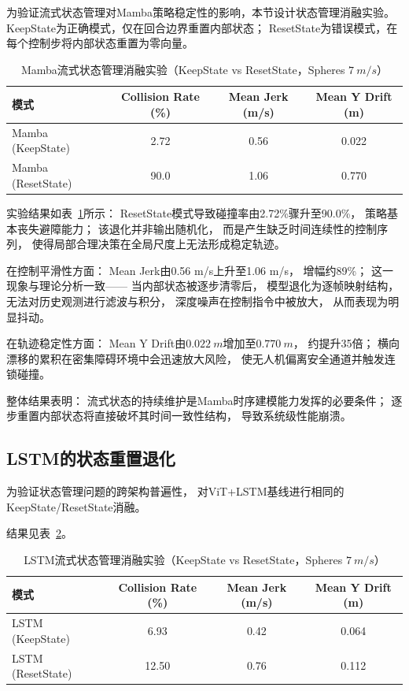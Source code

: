 为验证流式状态管理对Mamba策略稳定性的影响，本节设计状态管理消融实验。
KeepState为正确模式，仅在回合边界重置内部状态；
ResetState为错误模式，在每个控制步将内部状态重置为零向量。

\begin{table}[htbp]
\centering
\caption{Mamba流式状态管理消融实验（KeepState vs ResetState，Spheres $\SI{7}{m/s}$）}
\label{tab:state_ablation_ch4}
\begin{tabular}{lccc}
\toprule
模式 & Collision Rate (\%) & Mean Jerk (m/s) & Mean Y Drift (m) \\
\midrule
Mamba (KeepState)  & 2.72 & 0.56 & 0.022 \\
Mamba (ResetState) & 90.0 & 1.06 & 0.770 \\
\bottomrule
\end{tabular}
\end{table}

实验结果如表~\ref{tab:state_ablation_ch4}所示：
ResetState模式导致碰撞率由2.72\%骤升至90.0\%，
策略基本丧失避障能力；
该退化并非输出随机化，
而是产生缺乏时间连续性的控制序列，
使得局部合理决策在全局尺度上无法形成稳定轨迹。

在控制平滑性方面：
Mean Jerk由0.56 m/s上升至1.06 m/s，
增幅约89\%；
这一现象与理论分析一致——
当内部状态被逐步清零后，
模型退化为逐帧映射结构，
无法对历史观测进行滤波与积分，
深度噪声在控制指令中被放大，
从而表现为明显抖动。

在轨迹稳定性方面：
Mean Y Drift由$\SI{0.022}{m}$增加至$\SI{0.770}{m}$，
约提升35倍；
横向漂移的累积在密集障碍环境中会迅速放大风险，
使无人机偏离安全通道并触发连锁碰撞。

整体结果表明：
流式状态的持续维护是Mamba时序建模能力发挥的必要条件；
逐步重置内部状态将直接破坏其时间一致性结构，
导致系统级性能崩溃。

\subsection{LSTM的状态重置退化} \label{sec:ch4_lstm_reset}

为验证状态管理问题的跨架构普遍性，
对ViT+LSTM基线进行相同的KeepState/ResetState消融。

结果见表~\ref{tab:lstm_state_ablation}。
\begin{table}[htbp]
\centering
\caption{LSTM流式状态管理消融实验（KeepState vs ResetState，Spheres $\SI{7}{m/s}$）}
\label{tab:lstm_state_ablation}
\begin{tabular}{lccc}
\toprule
\textbf{模式} & \textbf{Collision Rate (\%)} & \textbf{Mean Jerk (m/s)} & \textbf{Mean Y Drift (m)} \\
\midrule
LSTM (KeepState)  & 6.93 & 0.42 & 0.064 \\
LSTM (ResetState) & 12.50 & 0.76 & 0.112 \\
\bottomrule
\end{tabular}
\end{table}

